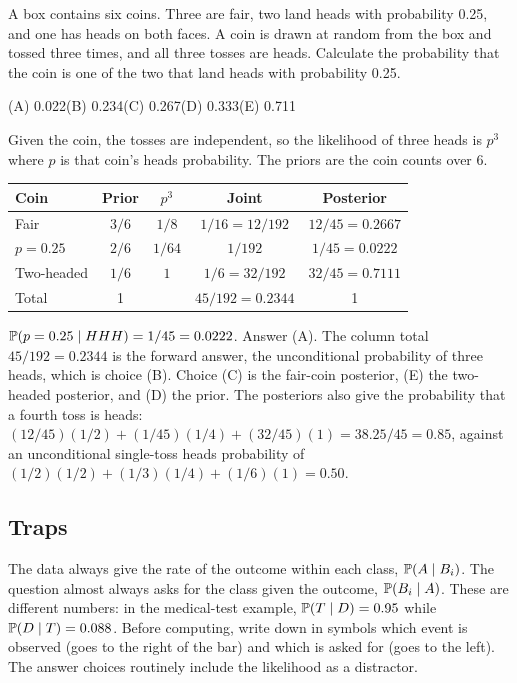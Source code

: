 \begin{example}
A box contains six coins. Three are fair, two land heads with probability 0.25, and one has
heads on both faces. A coin is drawn at random from the box and tossed three times, and all
three tosses are heads. Calculate the probability that the coin is one of the two that land
heads with probability 0.25.
\par\smallskip\noindent (A) 0.022\qquad (B) 0.234\qquad (C) 0.267\qquad (D) 0.333\qquad (E) 0.711
\end{example}
\begin{solution}
Given the coin, the tosses are independent, so the likelihood of three heads is $p^3$ where
$p$ is that coin's heads probability. The priors are the coin counts over 6.
\begin{center}
\begin{tabular}{@{}lcccc@{}}
\toprule
Coin & Prior & $p^3$ & Joint & Posterior \\
\midrule
Fair       & $3/6$ & $1/8$  & $1/16 = 12/192$ & $12/45 = 0.2667$ \\
$p = 0.25$ & $2/6$ & $1/64$ & $1/192$         & $1/45 = 0.0222$ \\
Two-headed & $1/6$ & $1$    & $1/6 = 32/192$  & $32/45 = 0.7111$ \\
\midrule
Total & 1 & & $45/192 = 0.2344$ & 1 \\
\bottomrule
\end{tabular}
\end{center}
$\mathbb{P}(p = 0.25 \mid HHH) = 1/45 = 0.0222$. Answer (A). The column total $45/192 = 0.2344$
is the forward answer, the unconditional probability of three heads, which is choice (B).
Choice (C) is the fair-coin posterior, (E) the two-headed posterior, and (D) the prior. The
posteriors also give the probability that a fourth toss is heads:
$(12/45)(1/2) + (1/45)(1/4) + (32/45)(1) = 38.25/45 = 0.85$, against an unconditional
single-toss heads probability of $(1/2)(1/2) + (1/3)(1/4) + (1/6)(1) = 0.50$.
\end{solution}

\subsection{Traps}

\begin{trap}
The data always give the rate of the outcome within each class, $\mathbb{P}(A \mid B_i)$. The
question almost always asks for the class given the outcome, $\mathbb{P}(B_i \mid A)$. These are
different numbers: in the medical-test example, $\mathbb{P}(T \mid D) = 0.95$ while
$\mathbb{P}(D \mid T) = 0.088$. Before computing, write down in symbols which event is observed
(goes to the right of the bar) and which is asked for (goes to the left). The answer choices
routinely include the likelihood as a distractor.
\end{trap}

